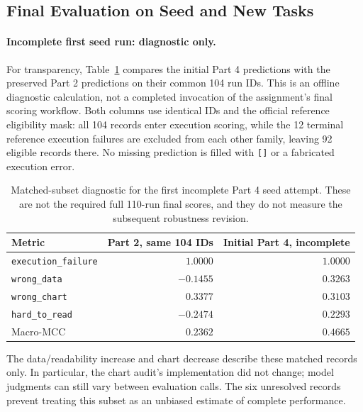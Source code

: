 \documentclass[11pt]{article}
\begin{document}
\subsection{Final Evaluation on Seed and New Tasks}
\paragraph{Incomplete first seed run: diagnostic only.}
For transparency, Table~\ref{tab:part4-incomplete-diagnostic} compares
the initial Part 4 predictions with the preserved Part 2 predictions
on their common 104 run IDs. This is an offline diagnostic calculation,
not a completed invocation of the assignment's final scoring workflow.
Both columns use identical IDs and the official reference eligibility
mask: all 104 records enter execution scoring, while the 12 terminal
reference execution failures are excluded from each other family,
leaving 92 eligible records there. No missing prediction is filled with
\texttt{[]} or a fabricated execution error.
\begin{table}[htbp]
\centering
\small
\begin{tabular}{lrr}
\toprule
Metric & Part 2, same 104 IDs & Initial Part 4, incomplete \\
\midrule
\texttt{execution\_failure} & $1.0000$ & $1.0000$ \\
\texttt{wrong\_data} & $-0.1455$ & $0.3263$ \\
\texttt{wrong\_chart} & $0.3377$ & $0.3103$ \\
\texttt{hard\_to\_read} & $-0.2474$ & $0.2293$ \\
Macro-MCC & $0.2362$ & $0.4665$ \\
\bottomrule
\end{tabular}
\caption{Matched-subset diagnostic for the first incomplete Part 4 seed
attempt. These are not the required full 110-run final scores, and they
do not measure the subsequent robustness revision.}
\label{tab:part4-incomplete-diagnostic}
\end{table}
The data/readability increase and chart decrease describe these matched
records only. In particular, the chart audit's implementation did not
change; model judgments can still vary between evaluation calls.
The six unresolved records prevent treating this subset as an unbiased
estimate of complete performance.
\end{document}
